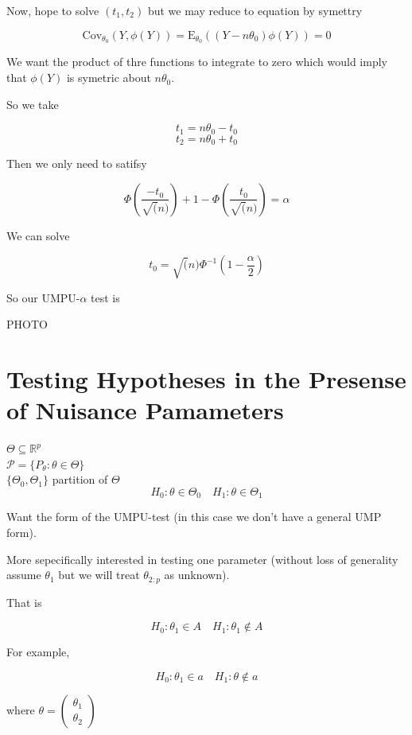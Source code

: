 \documentclass[11pt,fleqn]{book} %
\newcommand{\E}{\mathrm{E}}
\newcommand{\Cov}{\mathrm{Cov}}
\begin{document}
Now, hope to solve $(t_1, t_2)$ but we may reduce to equation by symettry

		$$\Cov _{\theta_0} (Y, \phi(Y)) = \E _{\theta_0} ((Y - n\theta_0) \phi(Y)) = 0 $$

We want the product of thre functions to integrate to zero which would imply that $\phi(Y)$ is symetric about $n\theta_0$.

So we take 

		$$t_1 = n\theta_0 - t_0 $$
		$$t_2 = n\theta_0 + t_0 $$

Then we only need to satifsy 

		$$\Phi(\frac{-t_0}{\sqrt(n)}) + 1 - \Phi(\frac{t_0}{\sqrt(n)}) = \alpha $$

We can solve

		$$t_0 = \sqrt(n) \Phi^{-1} (1 - \frac{\alpha}{2}) $$

So our UMPU-$\alpha$ test is 

PHOTO


\chapter{Testing Hypotheses in the Presense of Nuisance Pamameters}


$\Theta \subseteq \mathbb{R}^p$\\
$\mathscr{P} = \{P_\theta: \theta \in \Theta \}$\\
$\{\Theta_0, \Theta_1\}$ partition of $\Theta$\\

		$$H_0: \theta \in \Theta_0 \quad H_1: \theta \in \Theta_1 $$

Want the form of the UMPU-test (in this case we don't have a general UMP form). 

More sepecifically	interested in testing one parameter (without loss of generality assume $\theta_1$ but we will treat $\theta_{2:p}$ as unknown).

That is

		$$H_0: \theta_1 \in A \quad H_1: \theta_1 \notin A $$

For example, 

		$$H_0: \theta_1 \in a \quad H_1: \theta \notin a $$

where $\theta = \begin{pmatrix}
	\theta_1 \\
	\theta_2
\end{pmatrix}$\\
\end{document}
